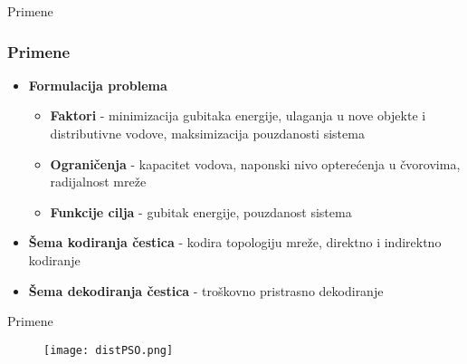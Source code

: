 \documentclass{beamer}
\begin{document}
\begin{frame}{Primene}

\frametitle{Primene}
\begin{itemize}
\item \textbf{Formulacija problema} 
\begin{itemize}
    \item \textbf{Faktori} - minimizacija gubitaka energije, ulaganja u nove objekte i distributivne vodove, maksimizacija pouzdanosti sistema
    \item \textbf{Ograničenja} - kapacitet vodova, naponski nivo opterećenja u čvorovima, radijalnost mreže
    \item \textbf{Funkcije cilja} - gubitak energije, pouzdanost sistema
\end{itemize}
\item \textbf{Šema kodiranja čestica} - kodira topologiju mreže, direktno i indirektno kodiranje
\item \textbf{Šema dekodiranja čestica} - troškovno pristrasno dekodiranje

\end{itemize}


\end{frame}


\begin{frame}{Primene}
\begin{figure}
\texttt{[image: distPSO.png]}
\end{figure}

\end{frame}
\end{document}

